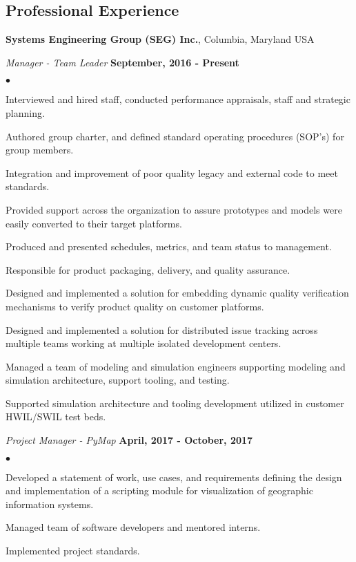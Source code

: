 \documentclass[margin,line]{res}
\newenvironment{list2}{%
  \begin{list}{$\bullet$}{%
      \setlength{\itemsep}{0in}
      \setlength{\parsep}{0in} \setlength{\parskip}{0in}
      \setlength{\topsep}{0in} \setlength{\partopsep}{0in} 
  \setlength{\leftmargin}{0.2in}}}{\end{list}}
\newcommand{\organization}[2] {{\bf #1}, #2\par}
\newcommand{\role}[2]{\vspace{-1em}\emph{#1} \hfill \textbf{#2}}
\begin{document}
\begin{resume}
\section{\sc Professional Experience}
\organization{Systems Engineering Group (SEG) Inc.}{Columbia, Maryland USA}
\role{Manager - Team Leader}{September, 2016 - Present}
\begin{list2}
\item Interviewed and hired staff, conducted performance appraisals, staff and strategic planning.
\item Authored group charter, and defined standard operating procedures (SOP's) for group members.
\item Integration and improvement of poor quality legacy and external code to meet standards.
\item Provided support across the organization to assure prototypes and models were easily converted to their target platforms.
\item Produced and presented schedules, metrics, and team status to management.
\item Responsible for product packaging, delivery, and quality assurance.
\item Designed and implemented a solution for embedding dynamic quality verification mechanisms to verify product quality on customer platforms.
\item Designed and implemented a solution for distributed issue tracking across multiple teams working at multiple isolated development centers.
\item Managed a team of modeling and simulation engineers supporting modeling and simulation architecture, support tooling, and testing. 
\item Supported simulation architecture and tooling development utilized in customer HWIL/SWIL test beds.
\end{list2}

\role{Project Manager - PyMap}{April, 2017 - October, 2017}
\begin{list2}
\item Developed a statement of work, use cases, and requirements defining the design and implementation of a scripting module for visualization of geographic information systems.
\item Managed team of software developers and mentored interns. 
\item Implemented project standards.
\end{list2}


\end{resume}
\end{document}
